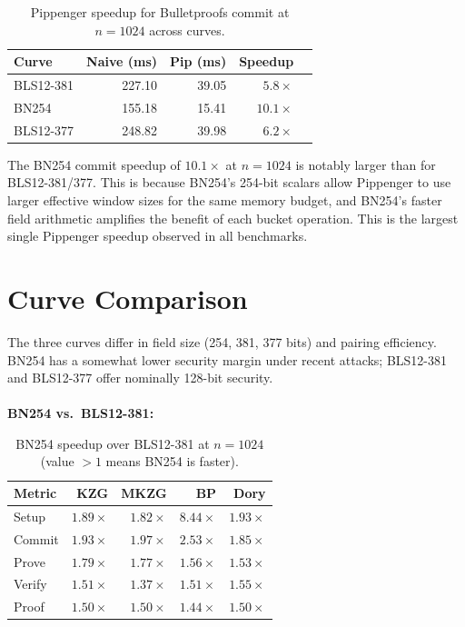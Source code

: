 \begin{table}[H]
\centering
\caption{Pippenger speedup for Bulletproofs commit at $n = 1024$ across curves.}
\label{tab:pip-bp-curves}
\begin{tabular}{lrrrr}
\toprule
\textbf{Curve} & \textbf{Naive (ms)} & \textbf{Pip (ms)} & \textbf{Speedup} \\
\midrule
BLS12-381 & 227.10 & 39.05 & $5.8\times$ \\
BN254     & 155.18 & 15.41 & $10.1\times$ \\
BLS12-377 & 248.82 & 39.98 & $6.2\times$ \\
\bottomrule
\end{tabular}
\end{table}

The BN254 commit speedup of $10.1\times$ at $n = 1024$ is notably
larger than for BLS12-381/377. This is because BN254's 254-bit scalars
allow Pippenger to use larger effective window sizes for the same
memory budget, and BN254's faster field arithmetic amplifies the
benefit of each bucket operation. This is the largest single Pippenger
speedup observed in all benchmarks.


\section{Curve Comparison}
\label{sec:curve-comparison}

The three curves differ in field size (254, 381, 377 bits) and pairing
efficiency. BN254 has a somewhat lower security margin under recent
attacks; BLS12-381 and BLS12-377 offer nominally 128-bit security.
\\\\
\textbf{BN254 vs.\ BLS12-381:}

\begin{table}[H]
\centering
\caption{BN254 speedup over BLS12-381 at $n = 1024$
(value $> 1$ means BN254 is faster).}
\label{tab:curve-ratio}
\begin{tabular}{lrrrr}
\toprule
\textbf{Metric} & \textbf{KZG} & \textbf{MKZG} & \textbf{BP} & \textbf{Dory} \\
\midrule
Setup    & $1.89\times$ & $1.82\times$ & $8.44\times$ & $1.93\times$ \\
Commit   & $1.93\times$ & $1.97\times$ & $2.53\times$ & $1.85\times$ \\
Prove    & $1.79\times$ & $1.77\times$ & $1.56\times$ & $1.53\times$ \\
Verify   & $1.51\times$ & $1.37\times$ & $1.51\times$ & $1.55\times$ \\
Proof    & $1.50\times$ & $1.50\times$ & $1.44\times$ & $1.50\times$ \\
\bottomrule
\end{tabular}
\end{table}


